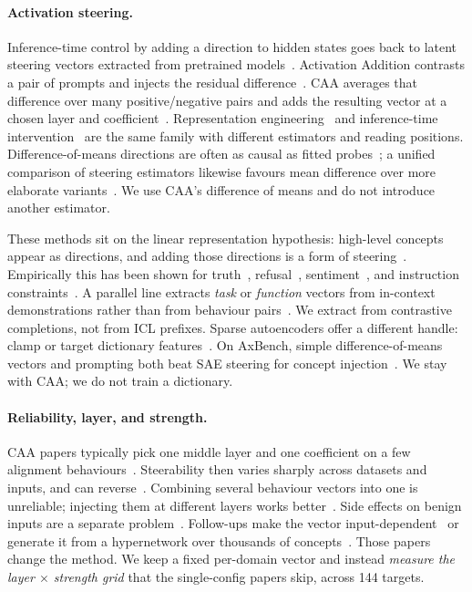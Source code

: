 \documentclass{article} %
\begin{document}
\paragraph{Activation steering.}
Inference-time control by adding a direction to hidden states goes back to latent steering vectors extracted from pretrained models~\citep{subramani2022latent}.
Activation Addition contrasts a pair of prompts and injects the residual difference~\citep{turner2024actadd}.
CAA averages that difference over many positive/negative pairs and adds the resulting vector at a chosen layer and coefficient~\citep{rimsky2024caa}.
Representation engineering~\citep{zou2023repe} and inference-time intervention~\citep{li2023iti} are the same family with different estimators and reading positions.
Difference-of-means directions are often as causal as fitted probes~\citep{marks2024geometry}; a unified comparison of steering estimators likewise favours mean difference over more elaborate variants~\citep{im2025unified}.
We use CAA's difference of means and do not introduce another estimator.

These methods sit on the linear representation hypothesis: high-level concepts appear as directions, and adding those directions is a form of steering~\citep{park2024linear}.
Empirically this has been shown for truth~\citep{marks2024geometry}, refusal~\citep{arditi2024refusal}, sentiment~\citep{tigges2023sentiment}, and instruction constraints~\citep{stolfo2025instruction}.
A parallel line extracts \emph{task} or \emph{function} vectors from in-context demonstrations rather than from behaviour pairs~\citep{hendel2023task,todd2024function,liu2024icv}.
We extract from contrastive completions, not from ICL prefixes.
Sparse autoencoders offer a different handle: clamp or target dictionary features~\citep{templeton2024sae,chalnev2024sae}.
On AxBench, simple difference-of-means vectors and prompting both beat SAE steering for concept injection~\citep{wu2025axbench}.
We stay with CAA; we do not train a dictionary.

\paragraph{Reliability, layer, and strength.}
CAA papers typically pick one middle layer and one coefficient on a few alignment behaviours~\citep{rimsky2024caa}.
Steerability then varies sharply across datasets and inputs, and can reverse~\citep{tan2024steering,pres2024unreliability}.
Combining several behaviour vectors into one is unreliable; injecting them at different layers works better~\citep{vanderweij2024extending}.
Side effects on benign inputs are a separate problem~\citep{stickland2024kts}.
Follow-ups make the vector input-dependent~\citep{wang2025sadi} or generate it from a hypernetwork over thousands of concepts~\citep{sun2025hypersteer}.
Those papers change the method.
We keep a fixed per-domain vector and instead \emph{measure the layer $\times$ strength grid} that the single-config papers skip, across 144 targets.
\end{document}
